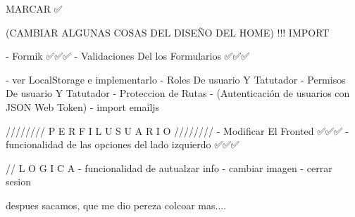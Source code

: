 
MARCAR ✅

(CAMBIAR ALGUNAS COSAS DEL DISEÑO DEL HOME) !!! IMPORT 

    - Formik ✅✅✅
    - Validaciones Del los Formularios ✅✅✅
    
    - ver LocalStorage e implementarlo
    - Roles De usuario Y Tatutador 
    - Permisos De usuario Y Tatutador
    - Proteccion de Rutas
    - (Autenticación de usuarios con JSON Web Token)
    - import emailjs 



////////   P E R F I L   U S U A R I O   ////////  
    - Modificar El Fronted ✅✅✅
    - funcionalidad de las opciones del lado izquierdo ✅✅✅

    // L O G I C A
    - funcionalidad de autualzar info 
    - cambiar imagen
    - cerrar sesion 

despues sacamos, que me dio pereza colcoar mas....


